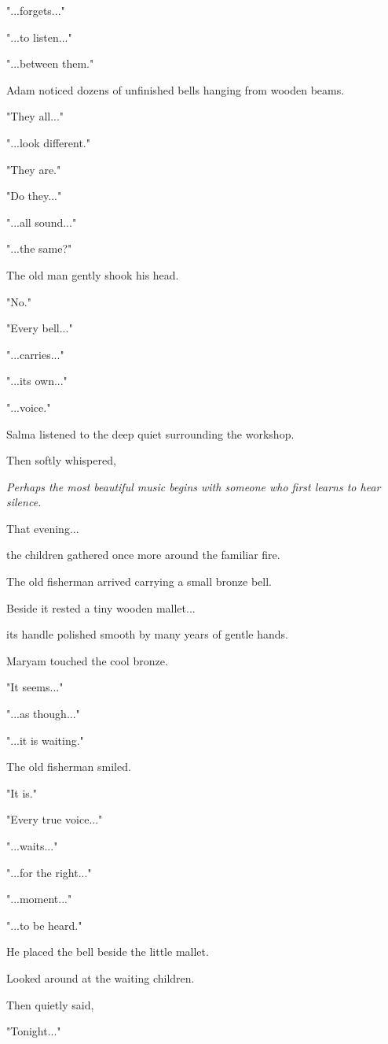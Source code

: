 \documentclass[12pt,openany]{book}
\begin{document}
"...forgets..."

"...to listen..."

"...between them."

Adam noticed dozens of unfinished bells hanging from wooden beams.

"They all..."

"...look different."

"They are."

"Do they..."

"...all sound..."

"...the same?"

The old man gently shook his head.

"No."

"Every bell..."

"...carries..."

"...its own..."

"...voice."

Salma listened to the deep quiet surrounding the workshop.

Then softly whispered,

\emph{Perhaps the most beautiful music begins with someone who first learns to hear silence.}

That evening...

the children gathered once more around the familiar fire.

The old fisherman arrived carrying a small bronze bell.

Beside it rested a tiny wooden mallet...

its handle polished smooth by many years of gentle hands.

Maryam touched the cool bronze.

"It seems..."

"...as though..."

"...it is waiting."

The old fisherman smiled.

"It is."

"Every true voice..."

"...waits..."

"...for the right..."

"...moment..."

"...to be heard."

He placed the bell beside the little mallet.

Looked around at the waiting children.

Then quietly said,

"Tonight..."
\end{document}
